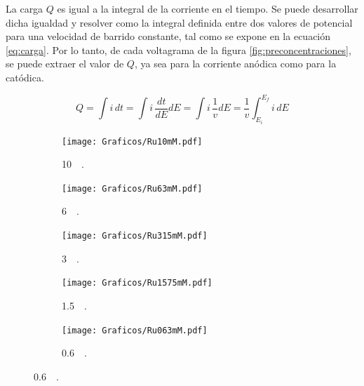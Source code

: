 			

		La carga $Q$ es igual a la integral de la corriente en el tiempo. Se puede desarrollar dicha igualdad y resolver como la integral definida entre dos valores de potencial para una velocidad de barrido constante, tal como se expone en la ecuación \ref{eq:carga}. Por lo tanto, de cada voltagrama de la figura \ref{fig:preconcentraciones}, se puede extraer el valor de $Q$, ya sea para la corriente anódica como para la catódica.
		
			\begin{equation}
					Q=\int i\,dt = \int i\, \frac{dt}{dE} dE = \int i\,\frac{1}{v}dE=\frac{1}{v}\int_{E_{i}}^{E_{f}} i\,dE
					\label{eq:carga}
			\end{equation}

			\begin{figure}[b!]
			   	    \begin{subfigure}[t]{0.325\textwidth}
			        	\texttt{[image: Graficos/Ru10mM.pdf]}
			        	\vspace*{-0.40cm}\caption{\aminorutenio\space \SI{10}{\milli\Molar}.}
			         	\label{fig:Ru10mM}
			     		\end{subfigure}
			   	    \begin{subfigure}[t]{0.325\textwidth}
			        	\texttt{[image: Graficos/Ru63mM.pdf]}
			       		\vspace*{-0.40cm}\caption{\aminorutenio\space \SI{6}{\milli\Molar}.}
			         	\label{fig:Ru63mM}
			     		\end{subfigure}
		     		\begin{subfigure}[t]{0.325\textwidth}
			        	\texttt{[image: Graficos/Ru315mM.pdf]}
			       		\vspace*{-0.40cm}\caption{\aminorutenio\space \SI{3}{\milli\Molar}.}
			         	\label{fig:Ru315mM}
			     		\end{subfigure}
		     		\begin{subfigure}[t]{0.325\textwidth}
			        	\texttt{[image: Graficos/Ru1575mM.pdf]}
			       		\vspace*{-0.40cm}\caption{\aminorutenio\space \SI{1.5}{\milli\Molar}.}
			         	\label{fig:Ru1575M}
			     		\end{subfigure}
		 	   	   	\begin{subfigure}[t]{0.325\textwidth}
			        	\texttt{[image: Graficos/Ru063mM.pdf]}
			       		\vspace*{-0.40cm}\caption{\aminorutenio\space \SI{0.6}{\milli\Molar}.}
			         	\label{fig:Ru063mM}

\end{subfigure}
\end{figure}
